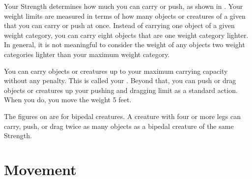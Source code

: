     Your Strength determines how much you can carry or push, as shown in .
    Your weight limits are measured in terms of how many objects or creatures of a given  that you can carry or push at once.
    Instead of carrying one object of a given weight category, you can carry eight objects that are one weight category lighter.
    In general, it is not meaningful to consider the weight of any objects two weight categories lighter than your maximum weight category.

    You can carry objects or creatures up to your maximum carrying capacity without any penalty.
    This is called your .
    Beyond that, you can push or drag objects or creatures up your pushing and dragging limit as a standard action.
    When you do, you move the weight 5 feet.

     The figures on  are for bipedal creatures.
    A creature with four or more legs can carry, push, or drag twice as many objects as a bipedal creature of the same Strength.

\section{Movement}


